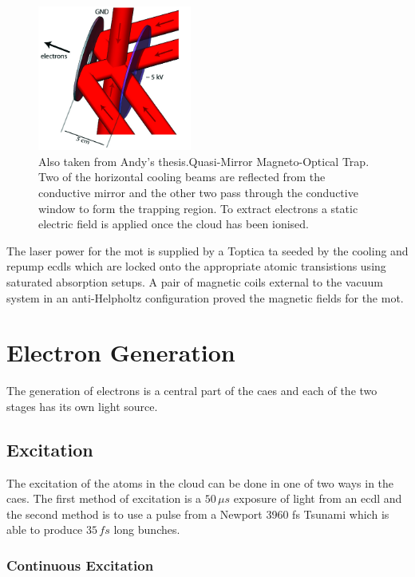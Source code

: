 \begin{figure}[h]
\centering
\includegraphics[width=0.45\textwidth]{figs/qMMOT.jpg}
\caption{{\color{red}Also taken from Andy's thesis.}Quasi-Mirror Magneto-Optical Trap. Two of the horizontal cooling beams are reflected from the conductive mirror and the other two pass through the conductive window to form the trapping region. To extract electrons a static electric field is applied once the cloud has been ionised.}
\label{fig:qmmot}
\end{figure}

The laser power for the \gls{mot} is supplied by a Toptica \gls{ta} seeded by the cooling and repump \glspl{ecdl} which are locked onto the appropriate atomic transistions using saturated absorption setups. A pair of magnetic coils external to the vacuum system in an anti-Helpholtz configuration proved the magnetic fields for the \gls{mot}.

\section{Electron Generation}

The generation of electrons is a central part of the \gls{caes} and each of the two stages has its own light source.

\subsection{Excitation}

The excitation of the atoms in the cloud can be done in one of two ways in the \gls{caes}. The first method of excitation is a $50\,\unit{\mu s}$ exposure of light from an \gls{ecdl} and the second method is to use a pulse from a Newport 3960 fs Tsunami which is able to produce $35\,\unit{fs}$ long bunches.

\subsubsection{Continuous Excitation}

